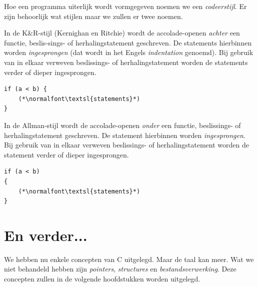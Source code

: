 Hoe een programma uiterlijk wordt vormgegeven noemen we een \textsl{codeerstijl}. Er zijn behoorlijk wat stijlen maar we zullen er twee noemen.

In de K\&R-stijl (Kernighan en Ritchie) wordt de accolade-openen \textsl{achter} een functie, beslis-sings- of herhalingstatement geschreven. De statements hierbinnen worden \textsl{ingesprongen} (dat wordt in het Engels \textsl{indentation} genoemd). Bij gebruik van in elkaar verweven beslissings- of herhalingstatement worden de statements verder of dieper ingesprongen.

\begin{lstlisting}[caption=K\&R-stijl.]
if (a < b) {
    (*\normalfont\textsl{statements}*)
}
\end{lstlisting}

In de Allman-stijl wordt de accolade-openen \textsl{onder} een functie, beslissings- of herhalingstatement geschreven. De statement hierbinnen worden \textsl{ingesprongen}. Bij gebruik van in elkaar verweven beslissings- of herhalingstatement worden de statement verder of dieper ingesprongen.

\begin{lstlisting}[caption=Allman-stijl.]
if (a < b)
{
    (*\normalfont\textsl{statements}*)
}
\end{lstlisting}

\section{En verder...}
We hebben nu enkele concepten van C uitgelegd. Maar de taal kan meer. Wat we niet behandeld hebben zijn \textsl{pointers}, \textsl{structures} en \textsl{bestandsverwerking}. Deze concepten zullen in de volgende hoofdstukken worden uitgelegd.
